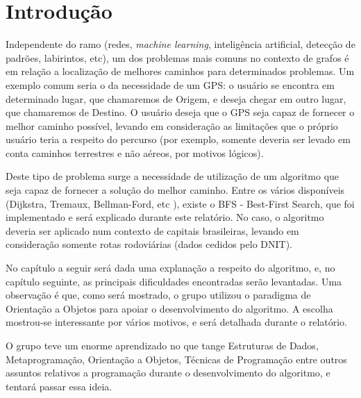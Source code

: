 \chapter[Introdução]{Introdução}

Independente do ramo (redes, \textit{machine learning}, inteligência artificial, detecção de padrões, labirintos, etc), um dos problemas mais comuns no contexto de grafos é em relação a localização de melhores caminhos para determinados problemas. Um exemplo comum seria o da necessidade de um GPS: o usuário se encontra em determinado lugar, que chamaremos de Origem, e deseja chegar em outro lugar, que chamaremos de Destino. O usuário deseja que o GPS seja capaz de fornecer o melhor caminho possível, levando em consideração as limitações que o próprio usuário teria a respeito do percurso (por exemplo, somente deveria ser levado em conta caminhos terrestres e não aéreos, por motivos lógicos).

Deste tipo de problema surge a necessidade de utilização de um algoritmo que seja capaz de fornecer a solução do melhor caminho. Entre os vários disponíveis (Dijkstra, Tremaux, Bellman-Ford, etc \cite{bfs001}), existe o BFS - Best-First Search, que foi implementado e será explicado durante este relatório. No caso, o algoritmo deveria ser aplicado num contexto de capitais brasileiras, levando em consideração somente rotas rodoviárias (dados cedidos pelo DNIT).

No capítulo a seguir será dada uma explanação a respeito do algoritmo, e, no capítulo seguinte, as principais dificuldades encontradas serão levantadas. Uma observação é que, como será mostrado, o grupo utilizou o paradigma de Orientação a Objetos para apoiar o desenvolvimento do algoritmo. A escolha mostrou-se interessante por vários motivos, e será detalhada durante o relatório.

O grupo teve um enorme aprendizado no que tange Estruturas de Dados, Metaprogramação, Orientação a Objetos, Técnicas de Programação entre outros assuntos relativos a programação durante o desenvolvimento do algoritmo, e tentará passar essa ideia.